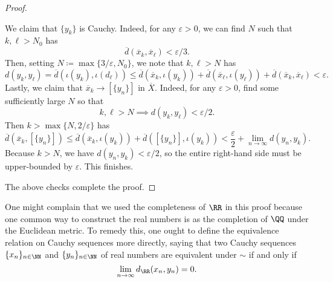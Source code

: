 \documentclass[../notes.tex]{subfiles}
\begin{document}
\begin{proof}
\begin{itemize}
		We claim that $\{y_k\}$ is Cauchy. Indeed, for any $\varepsilon>0$, we can find $N$ such that $k,\ell>N_0$ has
		\[\overline d(\overline x_k,\overline x_\ell)<\varepsilon/3.\]
		Then, setting $N\coloneqq\max\{3/\varepsilon,N_0\}$, we note that $k,\ell>N$ has
		\[d(y_k,y_\ell)=\overline d(\iota(y_k),\iota(d_\ell))\le\overline d(\overline x_k,\iota(y_k))+\overline d(\overline x_\ell,\iota(y_\ell))+\overline d(\overline x_k,\overline x_\ell)<\varepsilon.\]
		Lastly, we claim that $\overline x_k\to[\{y_n\}]$ in $\overline X$. Indeed, for any $\varepsilon>0$, find some sufficiently large $N$ so that
		\[k,\ell>N\implies d(y_k,y_\ell)<\varepsilon/2.\]
		Then $k>\max\{N,2/\varepsilon\}$ has
		\[\overline d(\overline x_k,[\{y_n\}])\le\overline d(\overline x_k,\iota(y_k))+\overline d([\{y_n\}],\iota(y_k))<\frac\varepsilon2+\lim_{n\to\infty}d(y_n,y_k).\]
		Because $k>N$, we have $d(y_n,y_k)<\varepsilon/2$, so the entire right-hand side must be upper-bounded by $\varepsilon$. This finishes.
	\end{itemize}
	The above checks complete the proof.
\end{proof}
\begin{remark}[Nir]
	One might complain that we used the completeness of $\RR$ in this proof because one common way to construct the real numbers is as the completion of $\QQ$ under the Euclidean metric. To remedy this, one ought to define the equivalence relation on Cauchy sequences more directly, saying that two Cauchy sequences $\{x_n\}_{n\in\NN}$ and $\{y_n\}_{n\in\NN}$ of real numbers are equivalent under $\sim$ if and only if
	\[\lim_{n\to\infty}d_\RR(x_n,y_n)=0.\]
\end{remark}
\end{document}
